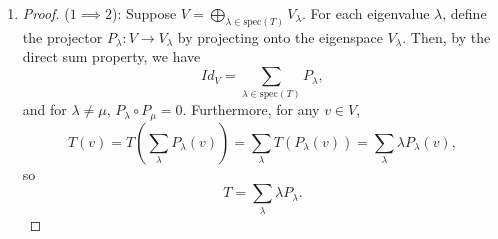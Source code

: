 \documentclass{article}
\begin{document}
\begin{enumerate}
\begin{enumerate}
\begin{proof}
            ($2 \implies 1$): Now suppose there exist projectors $P_i$ on the subspaces $V_i$ such that $Id_V = P_1 + P_2 + \cdots + P_k$ and $P_i \circ P_j = 0$ for $i \neq j$. For any $v \in V$, we can write
            \[
                v = Id_V(v) = (P_1 + P_2 + \cdots + P_k)(v) = P_1(v) + P_2(v) + \cdots + P_k(v).
            \]
            Since each $P_i(v) \in V_i$, this expresses $v$ as a sum of elements from the subspaces $V_i$. To show uniqueness, suppose
            \[
                v = v_1 + v_2 + \cdots + v_k = w_1 + w_2 + \cdots + w_k,
            \]
            with $v_i, w_i \in V_i$. Applying $P_j$ to both sides, we get
            \[
                P_j(v) = P_j(v_1 + \cdots + v_k) = v_j,
            \]
            and similarly
            \[
                P_j(v) = P_j(w_1 + \cdots + w_k) = w_j.
            \]
            Hence, $v_j = w_j$ for all $j$, proving uniqueness. Therefore, $V = V_1 \oplus V_2 \oplus \cdots \oplus V_k$.
        \end{proof}
        \item %
        \begin{proof}
            ($1 \implies 2$): Suppose $V = \bigoplus_{\lambda \in \text{spec}(T)} V_\lambda$. For each eigenvalue $\lambda$, define the projector $P_\lambda: V \to V_\lambda$ by projecting onto the eigenspace $V_\lambda$. Then, by the direct sum property, we have
            \[
                Id_V = \sum_{\lambda \in \text{spec}(T)} P_\lambda,
            \]
            and for $\lambda \neq \mu$, $P_\lambda \circ P_\mu = 0$. Furthermore, for any $v \in V$,
            \[
                T(v) = T\left(\sum_{\lambda} P_\lambda(v)\right) = \sum_{\lambda} T(P_\lambda(v)) = \sum_{\lambda} \lambda P_\lambda(v),
            \]
            so
            \[
                T = \sum_{\lambda} \lambda P_\lambda.
            \]


\end{proof}
\end{enumerate}
\end{enumerate}
\end{document}
